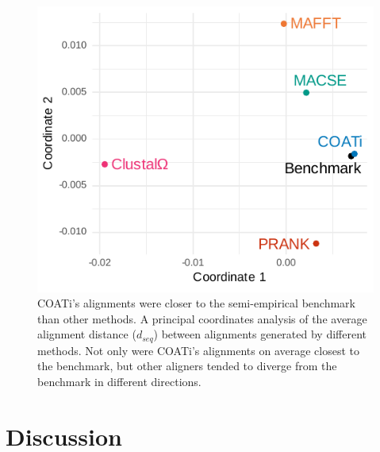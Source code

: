 \documentclass[12pt,letterpaper]{article}
\begin{document}
\begin{figure}[h!]
    \centering%
    \includegraphics{figures/fig-dseq-benchmarks.pdf}
    \par
    \caption{COATi's alignments were closer to the semi-empirical benchmark than other methods. A principal coordinates analysis of the average alignment distance ($d_{seq}$) between alignments generated by different methods. Not only were COATi's alignments on average closest to the benchmark, but other aligners tended to diverge from the benchmark in different directions.
%
    \label{fig:dseq-benchmarks}}
\end{figure}

\clearpage

\section*{Discussion}
\end{document}
